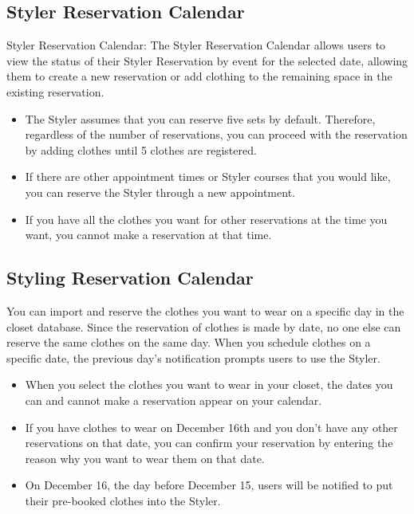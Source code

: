 \documentclass[conference]{IEEEtran}
\begin{document}
\subsection{Styler Reservation Calendar}
Styler Reservation Calendar: The Styler Reservation Calendar allows users to view the status of their Styler Reservation by event for the selected date, allowing them to create a new reservation or add clothing to the remaining space in the existing reservation.\\
\begin{itemize}
    \item The Styler assumes that you can reserve five sets by default. Therefore, regardless of the number of reservations, you can proceed with the reservation by adding clothes until 5 clothes are registered.\\
    \item If there are other appointment times or Styler courses that you would like, you can reserve the Styler through a new appointment.\\
    \item If you have all the clothes you want for other reservations at the time you want, you cannot make a reservation at that time.\\
\end{itemize}

\subsection{Styling Reservation Calendar}
You can import and reserve the clothes you want to wear on a specific day in the closet database. Since the reservation of clothes is made by date, no one else can reserve the same clothes on the same day. When you schedule clothes on a specific date, the previous day's notification prompts users to use the Styler.\\
\begin{itemize}
\item
When you select the clothes you want to wear in your closet, the dates you can and cannot make a reservation appear on your calendar.
\item
If you have clothes to wear on December 16th and you don't have any other reservations on that date, you can confirm your reservation by entering the reason why you want to wear them on that date.
\item
On December 16, the day before December 15, users will be notified to put their pre-booked clothes into the Styler.\\
\end{itemize}
\end{document}

